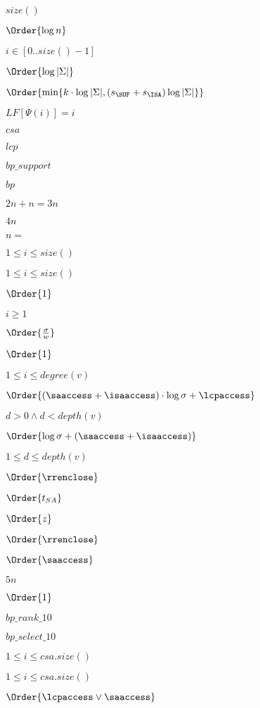 \documentclass{article}
\begin{document}
$size()$
\pagebreak

$ \Order{\log n} $
\pagebreak

$i\in [0..size()-1]$
\pagebreak

$ \Order{\log |\Sigma|} $
\pagebreak

$ \Order{\min\{k\cdot \log |\Sigma|, (s_{\SUF}+s_{\ISA})\log|\Sigma|\}} $
\pagebreak

$LF[\Psi(i)]=i$
\pagebreak

$csa$
\pagebreak

$lcp$
\pagebreak

$bp\_support$
\pagebreak

$bp$
\pagebreak

$2n+n=3n$
\pagebreak

$4n$
\pagebreak

$n=$
\pagebreak

$1\leq i\leq size()$
\pagebreak

$ 1 \leq i \leq size() $
\pagebreak

$ \Order{1}$
\pagebreak

$i \geq 1$
\pagebreak

$ \Order{\frac{\sigma}{w}} $
\pagebreak

$\Order{1}$
\pagebreak

$ 1 \leq i \leq degree(v) $
\pagebreak

$ \Order{(\saaccess+\isaaccess) \cdot \log\sigma + \lcpaccess} $
\pagebreak

$ d > 0 \wedge d < depth(v) $
\pagebreak

$ \Order{ \log\sigma + (\saaccess+\isaaccess) } $
\pagebreak

$ 1 \leq d \leq depth(v) $
\pagebreak

$ \Order{\rrenclose}\ $
\pagebreak

$\Order{t_{SA}}$
\pagebreak

$ \Order{z} $
\pagebreak

$ \Order{ \rrenclose } $
\pagebreak

$ \Order{ \saaccess } $
\pagebreak

$5n$
\pagebreak

$\Order{1} $
\pagebreak

$bp\_rank\_10$
\pagebreak

$bp\_select\_10$
\pagebreak

$1\leq i\leq csa.size()$
\pagebreak

$ 1 \leq i \leq csa.size() $
\pagebreak

$ \Order{\lcpaccess \vee \saaccess} $
\pagebreak
\end{document}
